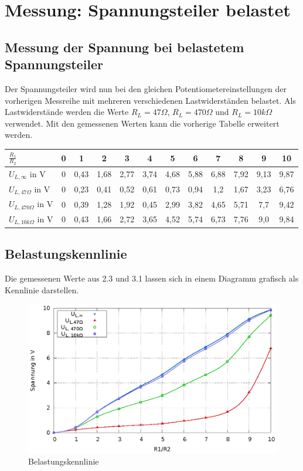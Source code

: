 \documentclass[
a4paper,     %
 headsepline, %
11pt         %
]{scrartcl}  %
\begin{document}
\section{Messung: Spannungsteiler belastet}
\subsection{Messung der Spannung bei belastetem Spannungsteiler}
Der Spannungsteiler wird nun bei den gleichen Potentiometereinstellungen der vorherigen Messreihe mit mehreren verschiedenen Lastwiderständen belastet. Als Lastwiderstände werden die Werte $R_L=47\Omega$, $R_L=470\Omega$ und $R_L=10k\Omega$ verwendet. Mit den gemessenen Werten kann die vorherige Tabelle erweitert werden.
\begin{center}
  \begin{tabular}{ l | c | c | c | c | c | c | c | c | c | c | c }
    \hline
    $\frac{R_1}{R_2}$        & 0    & 1    & 2    & 3    & 4    & 5    & 6    & 7    & 8    & 9    & 10       \\ \hline
    $U_{L, \infty}$ in V     & 0    & 0,43 & 1,68 & 2,77 & 3,74 & 4,68 & 5,88 & 6,88 & 7,92 & 9,13 & 9,87     \\ \hline
    $U_{L, 47\Omega}$ in V   & 0    & 0,23 & 0,41 & 0,52 & 0,61 & 0,73 & 0,94 & 1,2  & 1,67 & 3,23 & 6,76     \\ \hline
    $U_{L, 470\Omega}$ in V  & 0    & 0,39 & 1,28 & 1,92 & 0,45 & 2,99 & 3,82 & 4,65 & 5,71 & 7,7  & 9,42     \\ \hline
    $U_{L, 10k\Omega}$ in V  & 0    & 0,43 & 1,66 & 2,72 & 3,65 & 4,52 & 5,74 & 6,73 & 7,76 & 9,0  & 9,84     \\
    \hline
  \end{tabular}
\end{center}



\subsection{Belastungskennlinie}
Die gemessenen Werte aus 2.3 und 3.1 lassen sich in einem Diagramm grafisch als Kennlinie darstellen.

\begin{figure}[hbtp]
\caption{Belastungskennlinie}
\centering
\includegraphics[scale=1]{belastungskennlinie.eps}
\end{figure}
\end{document}
